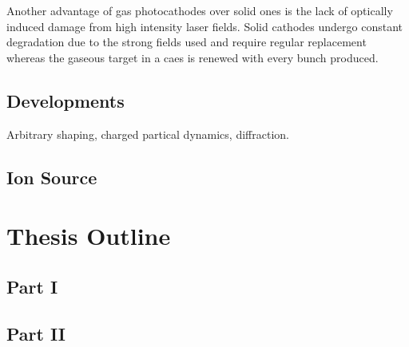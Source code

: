 Another advantage of gas photocathodes over solid ones is the lack of optically induced damage from high intensity laser fields.
Solid cathodes undergo constant degradation due to the strong fields used and require regular replacement~\cite{dowell_results_1995} whereas the gaseous target in a \gls{caes} is renewed with every bunch produced.

\subsection{Developments}

Arbitrary shaping, charged partical dynamics, diffraction.
\subsection{Ion Source}

\section{Thesis Outline}

\subsection{Part I}

\subsection{Part II}
